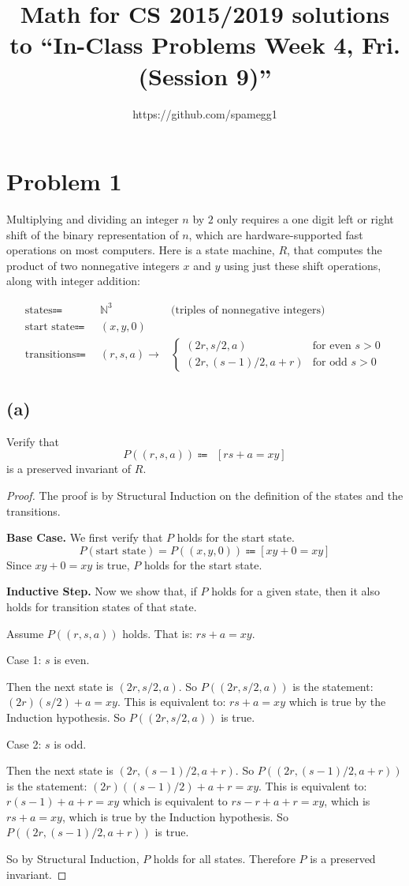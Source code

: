\documentclass[14pt]{extarticle}
\title{Math for CS 2015/2019 solutions to ``In-Class Problems Week 4, Fri. (Session 9)''}
\author{https://github.com/spamegg1}
\begin{document}
\maketitle
\tableofcontents

\section{Problem 1}
Multiplying and dividing an integer $n$ by $2$ only requires a one digit left or right shift of the binary representation of $n$, which are hardware-supported fast operations on most computers. Here is a state machine, $R$, that computes the product of two nonnegative integers $x$ and $y$ using just these shift operations, along with integer addition:

\begin{align*}
\text{states} \Coloneqq & \,\,\, \mathbb{N}^3 & \text{(triples of nonnegative integers)}\\
\text{start state} \Coloneqq & \,\,\, (x, y, 0) & \\
\text{transitions} \Coloneqq & \,\,\,(r, s, a) \longrightarrow & \left\{
     \begin{array}{lr}
       (2r, s/2, a) & \text{for even } s > 0\\
			(2r, (s-1)/2, a + r) & \text{for odd } s > 0
     \end{array}
   \right.
\end{align*}

\subsection{(a)}
Verify that
$$
P((r, s, a)) \Coloneqq \,\,\, [rs + a = xy]
$$
is a preserved invariant of $R$.
\begin{proof}
The proof is by Structural Induction on the definition of the states and the transitions.

{\bf Base Case.} We first verify that $P$ holds for the start state.
$$
P(\text{start state}) = P((x, y, 0)) \Coloneqq [xy + 0 = xy]
$$
Since $xy + 0 = xy$ is true, $P$ holds for the start state.

{\bf Inductive Step.} Now we show that, if $P$ holds for a given state, then it also holds for transition states of that state.

Assume $P((r, s, a))$ holds. That is: $rs + a = xy$.

Case 1: $s$ is even. 

Then the next state is $(2r, s/2, a)$. So  $P((2r, s/2, a))$ is the statement: $(2r)(s/2) + a = xy$. This is equivalent to: $rs + a = xy$ which is true by the Induction hypothesis. So $P((2r, s/2, a))$ is true.

Case 2: $s$ is odd. 

Then the next state is $(2r, (s-1)/2, a + r)$. So  $P((2r, (s-1)/2, a+r))$ is the statement: $(2r)((s-1)/2) + a + r = xy$. This is equivalent to: $r(s-1) + a + r = xy$ which is equivalent to $rs-r + a + r = xy$, which is $rs + a = xy$, which is true by the Induction hypothesis. So $P((2r, (s-1)/2, a + r))$ is true.

So by Structural Induction, $P$ holds for all states. Therefore $P$ is a preserved invariant.
\end{proof}
\end{document}
